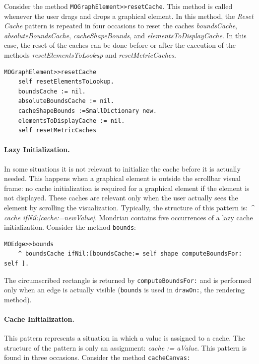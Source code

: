 \documentclass[preprint,10pt]{sigplanconf}
\newcommand{\ct}{\lstinline[backgroundcolor=\color{white},basicstyle=\footnotesize\ttfamily]}
\begin{document}
Consider the method \ct{MOGraphElement>>resetCache}. This method is called whenever the user drags and drops a graphical element. In
this method, the \emph{Reset Cache} pattern is repeated in four occasions to reset the caches \emph{boundsCache}, \emph{absoluteBoundsCache},
\emph{cacheShapeBounds}, and \emph{elementsToDisplayCache}. In this case, the reset of the caches can be done before or after the execution of the methods \emph{resetElementsToLookup} and  \emph{resetMetricCaches}.

\begin{lstlisting} 
MOGraphElement>>resetCache 
	self resetElementsToLookup.
	boundsCache := nil. 
	absoluteBoundsCache := nil. 
	cacheShapeBounds :=SmallDictionary new. 
	elementsToDisplayCache := nil. 
	self resetMetricCaches
\end{lstlisting}



\paragraph{Lazy Initialization.} In some situations it is not relevant to initialize the cache before it is actually needed. This happens when a graphical element is outside the scrollbar visual frame: no cache initialization is required for a graphical element if the element is not displayed. These caches are relevant only when the user actually sees the element by scrolling the visualization. Typically, the structure of this pattern is: \emph{\^{} cache ifNil:[cache:=newValue]}. Mondrian contains five occurrences of a lazy cache initialization. Consider the method \ct{bounds}:

\begin{lstlisting} 
MOEdge>>bounds  
	^ boundsCache ifNil:[boundsCache:= self shape computeBoundsFor: self ]. 
\end{lstlisting}

The circumscribed rectangle is returned by \ct{computeBoundsFor:} and is performed only when an edge is actually visible (\ct{bounds} is used in \ct{drawOn:}, the rendering method).

\paragraph{Cache Initialization.} This pattern represents a situation in
which a value is assigned to a cache. The structure of the pattern
is only an assignment: \emph{cache := aValue}. This pattern is found
in three occasions. Consider the method \ct{cacheCanvas:}
\end{document}
